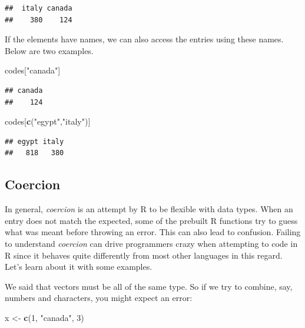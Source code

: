 \documentclass[
]{article}
\newenvironment{Shaded}{\begin{snugshade}}{\end{snugshade}}
\newcommand{\DecValTok}[1]{\textcolor[rgb]{0.00,0.00,0.81}{#1}}
\newcommand{\FunctionTok}[1]{\textcolor[rgb]{0.13,0.29,0.53}{\textbf{#1}}}
\newcommand{\NormalTok}[1]{#1}
\newcommand{\OtherTok}[1]{\textcolor[rgb]{0.56,0.35,0.01}{#1}}
\newcommand{\StringTok}[1]{\textcolor[rgb]{0.31,0.60,0.02}{#1}}
\begin{document}
\begin{verbatim}
##  italy canada 
##    380    124
\end{verbatim}

If the elements have names, we can also access the entries using these
names. Below are two examples.

\begin{Shaded}
\begin{Highlighting}[]
\NormalTok{codes[}\StringTok{"canada"}\NormalTok{]}
\end{Highlighting}
\end{Shaded}

\begin{verbatim}
## canada 
##    124
\end{verbatim}

\begin{Shaded}
\begin{Highlighting}[]
\NormalTok{codes[}\FunctionTok{c}\NormalTok{(}\StringTok{"egypt"}\NormalTok{,}\StringTok{"italy"}\NormalTok{)]}
\end{Highlighting}
\end{Shaded}

\begin{verbatim}
## egypt italy 
##   818   380
\end{verbatim}

\subsection{Coercion}\label{coercion}

In general, \emph{coercion} is an attempt by R to be flexible with data
types. When an entry does not match the expected, some of the prebuilt R
functions try to guess what was meant before throwing an error. This can
also lead to confusion. Failing to understand \emph{coercion} can drive
programmers crazy when attempting to code in R since it behaves quite
differently from most other languages in this regard. Let's learn about
it with some examples.

We said that vectors must be all of the same type. So if we try to
combine, say, numbers and characters, you might expect an error:

\begin{Shaded}
\begin{Highlighting}[]
\NormalTok{x }\OtherTok{\textless{}{-}} \FunctionTok{c}\NormalTok{(}\DecValTok{1}\NormalTok{, }\StringTok{"canada"}\NormalTok{, }\DecValTok{3}\NormalTok{)}
\end{Highlighting}
\end{Shaded}
\end{document}
